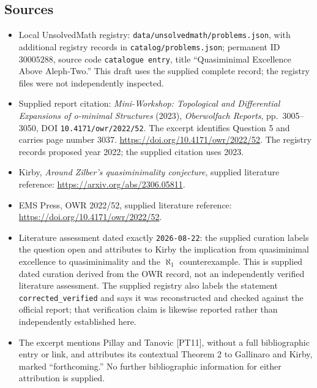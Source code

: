 \documentclass[11pt]{article}
\begin{document}
\subsection{Sources}
\begin{itemize}
\item Local UnsolvedMath registry: \texttt{data/unsolvedmath/problems.json}, with additional registry records in \texttt{catalog/problems.json}; permanent ID \(30005288\), source code \texttt{catalogue entry}, title ``Quasiminimal Excellence Above Aleph-Two.'' This draft uses the supplied complete record; the registry files were not independently inspected.
\item Supplied report citation: \emph{Mini-Workshop: Topological and Differential Expansions of o-minimal Structures} (2023), \emph{Oberwolfach Reports}, pp.\ 3005--3050, DOI \texttt{10.4171/owr/2022/52}. The excerpt identifies Question 5 and carries page number 3037. \url{https://doi.org/10.4171/owr/2022/52}. The registry records proposed year 2022; the supplied citation uses 2023.
\item Kirby, \emph{Around Zilber's quasiminimality conjecture}, supplied literature reference: \url{https://arxiv.org/abs/2306.05811}.
\item EMS Press, OWR 2022/52, supplied literature reference: \url{https://doi.org/10.4171/owr/2022/52}.
\item Literature assessment dated exactly \texttt{2026-08-22}: the supplied curation labels the question open and attributes to Kirby the implication from quasiminimal excellence to quasiminimality and the \(\aleph_1\) counterexample. This is supplied dated curation derived from the OWR record, not an independently verified literature assessment. The supplied registry also labels the statement \texttt{corrected\_verified} and says it was reconstructed and checked against the official report; that verification claim is likewise reported rather than independently established here.
\item The excerpt mentions Pillay and Tanovic [PT11], without a full bibliographic entry or link, and attributes its contextual Theorem 2 to Gallinaro and Kirby, marked ``forthcoming.'' No further bibliographic information for either attribution is supplied.
\end{itemize}
\end{document}
